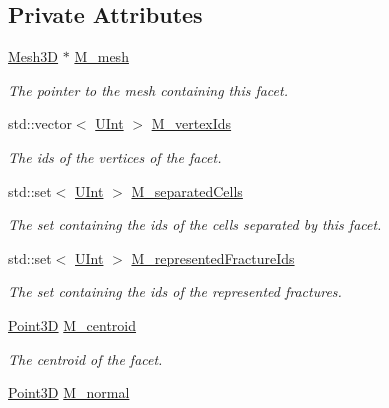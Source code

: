 \subsection*{Private Attributes}
\begin{DoxyCompactItemize}
\item 
\hyperlink{classFVCode3D_1_1Mesh3D}{Mesh3D} $\ast$ \hyperlink{classFVCode3D_1_1Mesh3D_1_1Facet3D_adf8cf45ade4804389de18428aea4969d}{M\+\_\+mesh}
\begin{DoxyCompactList}\small\item\em The pointer to the mesh containing this facet. \end{DoxyCompactList}\item 
std\+::vector$<$ \hyperlink{namespaceFVCode3D_a4bf7e328c75d0fd504050d040ebe9eda}{U\+Int} $>$ \hyperlink{classFVCode3D_1_1Mesh3D_1_1Facet3D_ae763d815d2b4406b2f09d0ee5133392c}{M\+\_\+vertex\+Ids}
\begin{DoxyCompactList}\small\item\em The ids of the vertices of the facet. \end{DoxyCompactList}\item 
std\+::set$<$ \hyperlink{namespaceFVCode3D_a4bf7e328c75d0fd504050d040ebe9eda}{U\+Int} $>$ \hyperlink{classFVCode3D_1_1Mesh3D_1_1Facet3D_a17706f1909c2479234a70c5e8bc440dd}{M\+\_\+separated\+Cells}
\begin{DoxyCompactList}\small\item\em The set containing the ids of the cells separated by this facet. \end{DoxyCompactList}\item 
std\+::set$<$ \hyperlink{namespaceFVCode3D_a4bf7e328c75d0fd504050d040ebe9eda}{U\+Int} $>$ \hyperlink{classFVCode3D_1_1Mesh3D_1_1Facet3D_ad727210646d148f7af81755fb086310c}{M\+\_\+represented\+Fracture\+Ids}
\begin{DoxyCompactList}\small\item\em The set containing the ids of the represented fractures. \end{DoxyCompactList}\item 
\hyperlink{classFVCode3D_1_1Point3D}{Point3D} \hyperlink{classFVCode3D_1_1Mesh3D_1_1Facet3D_a6f7dafb218d207354ad6454f4825728f}{M\+\_\+centroid}
\begin{DoxyCompactList}\small\item\em The centroid of the facet. \end{DoxyCompactList}\item 
\hyperlink{classFVCode3D_1_1Point3D}{Point3D} \hyperlink{classFVCode3D_1_1Mesh3D_1_1Facet3D_ada6d0c218b56473802d91a34f2ecc4cf}{M\+\_\+normal}

\end{DoxyCompactItemize}
